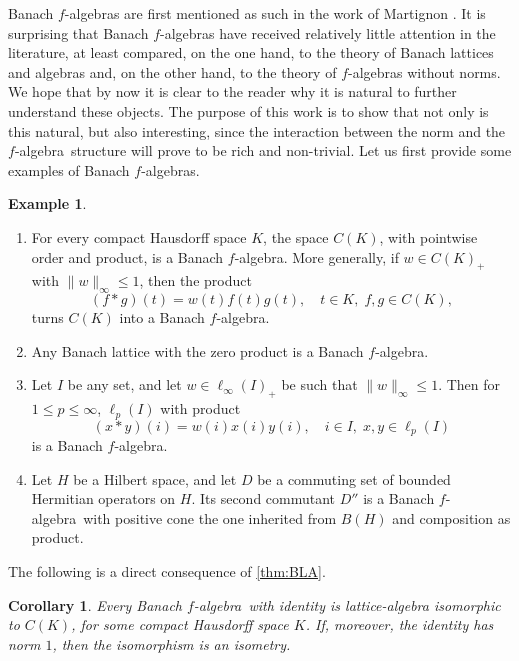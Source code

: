 \documentclass{memo-l}
\newtheorem{cor}[theorem]{Corollary}
\theoremstyle{definition}
\newtheorem{example}[theorem]{Example}
\theoremstyle{remark}
\numberwithin{section}{chapter}
\numberwithin{equation}{chapter}
\newcommand{\el}[1]{\ensuremath{\ell_{#1}}}
\newcommand{\falg}{$f\!$-algebra}
\begin{document}
Banach \falg s are first mentioned as such in the work of Martignon
\cite{martignon1980}. It is surprising that Banach \falg s have
received relatively little attention in the literature, at least compared, on the one hand, to the theory of Banach lattices and algebras and, on the other
hand, to the theory of \falg s without norms. We hope that by now it
is clear to the reader why it is natural to further understand these
objects. The purpose of this work is to show that not only is this natural, but also interesting, since the interaction between the
norm and the \falg\ structure will prove to be rich and non-trivial. Let us first provide some examples of Banach \falg s.

\begin{example}\leavevmode
    \begin{enumerate}
        \item For every compact Hausdorff space $K$, the space $C(K)$,
            with pointwise order and product, is a Banach \falg. More
            generally, if $w \in C(K)_+$ with $\|w\|_\infty \le 1$,
            then the product
            \[
                (f \ast g)(t)=w(t)f(t)g(t),\quad t \in K,\;f,g \in
                C(K),
            \]
            turns $C(K)$ into a Banach \falg.
        \item Any Banach lattice with the zero product is a Banach
            \falg.
        \item Let $I$ be any set, and let $w \in \el \infty (I)_+$ be
            such that $\|w\|_\infty \le 1$. Then for $1\le p \le\infty$, $\el p(I)$ with
            product
            \[
                (x \ast y)(i)=w(i)x(i)y(i),\quad i \in I,\; x,y \in
                \el p(I)
            \]
            is a Banach \falg.
        \item Let $H$ be a Hilbert space, and let $D$ be a commuting
            set of bounded Hermitian operators on $H$. Its second
            commutant $D''$ is a Banach \falg\ with positive cone the
            one inherited from $B(H)$ and composition as product.
    \end{enumerate}
\end{example}

The following is a direct consequence of \cref{thm:BLA}.

\begin{cor}
    Every Banach \falg\ with identity is lattice-algebra isomorphic
    to $C(K)$, for some compact Hausdorff space $K$. If, moreover, the
    identity has norm $1$, then the isomorphism is an isometry.
\end{cor}
\end{document}
